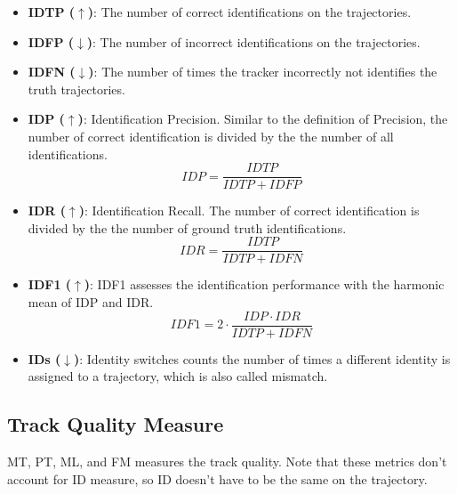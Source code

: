 \begin{itemize}

\item \textbf{IDTP ($\uparrow$)}: The number of correct identifications on the trajectories.

\item \textbf{IDFP ($\downarrow$)}: The number of incorrect identifications on the trajectories.

\item \textbf{IDFN ($\downarrow$)}: The number of times the tracker incorrectly not identifies the truth trajectories.

\item \textbf{IDP ($\uparrow$)}: Identification Precision. Similar to the definition of Precision, the number of correct identification is divided by the the number of all identifications.
\begin{equation}
IDP = \frac{IDTP}{IDTP + IDFP}
\label{eqn:IDP}
\end{equation}

\item \textbf{IDR ($\uparrow$)}: Identification Recall. The number of correct identification is divided by the the number of ground truth identifications.
\begin{equation}
IDR = \frac{IDTP}{IDTP + IDFN}
\label{eqn:IDR}
\end{equation}

\item \textbf{IDF1 ($\uparrow$)}: IDF1 assesses the identification performance with the harmonic mean of IDP and IDR. 
\begin{equation}
IDF1 = 2 \cdot \frac{IDP \cdot IDR}{IDTP + IDFN}
\label{eqn:IDF1}
\end{equation}

\item \textbf{IDs ($\downarrow$)}: Identity switches counts the number of times a different identity is assigned to a trajectory, which is also called mismatch.
\end{itemize}



\subsection{Track Quality Measure}
MT, PT, ML, and FM measures the track quality. Note that these metrics don't account for ID measure, so ID doesn't have to be the same on the trajectory.

